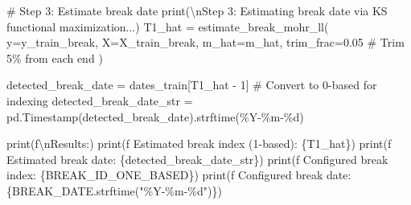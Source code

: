 \documentclass[
  letterpaper,
  DIV=11,
  numbers=noendperiod]{scrartcl}
\newenvironment{Shaded}{\begin{snugshade}}{\end{snugshade}}
\newcommand{\BuiltInTok}[1]{\textcolor[rgb]{0.00,0.23,0.31}{#1}}
\newcommand{\CharTok}[1]{\textcolor[rgb]{0.13,0.47,0.30}{#1}}
\newcommand{\CommentTok}[1]{\textcolor[rgb]{0.37,0.37,0.37}{#1}}
\newcommand{\DecValTok}[1]{\textcolor[rgb]{0.68,0.00,0.00}{#1}}
\newcommand{\FloatTok}[1]{\textcolor[rgb]{0.68,0.00,0.00}{#1}}
\newcommand{\NormalTok}[1]{\textcolor[rgb]{0.00,0.23,0.31}{#1}}
\newcommand{\OperatorTok}[1]{\textcolor[rgb]{0.37,0.37,0.37}{#1}}
\newcommand{\SpecialCharTok}[1]{\textcolor[rgb]{0.37,0.37,0.37}{#1}}
\newcommand{\SpecialStringTok}[1]{\textcolor[rgb]{0.13,0.47,0.30}{#1}}
\newcommand{\StringTok}[1]{\textcolor[rgb]{0.13,0.47,0.30}{#1}}
\begin{document}
\begin{Shaded}
\begin{Highlighting}[]
\CommentTok{\# Step 3: Estimate break date}
\BuiltInTok{print}\NormalTok{(}\StringTok{\textquotesingle{}}\CharTok{\textbackslash{}n}\StringTok{Step 3: Estimating break date via KS functional maximization...\textquotesingle{}}\NormalTok{)}
\NormalTok{T1\_hat }\OperatorTok{=}\NormalTok{ estimate\_break\_mohr\_ll(}
\NormalTok{    y}\OperatorTok{=}\NormalTok{y\_train\_break,}
\NormalTok{    X}\OperatorTok{=}\NormalTok{X\_train\_break,}
\NormalTok{    m\_hat}\OperatorTok{=}\NormalTok{m\_hat,}
\NormalTok{    trim\_frac}\OperatorTok{=}\FloatTok{0.05}  \CommentTok{\# Trim 5\% from each end}
\NormalTok{)}

\NormalTok{detected\_break\_date }\OperatorTok{=}\NormalTok{ dates\_train[T1\_hat }\OperatorTok{{-}} \DecValTok{1}\NormalTok{]  }\CommentTok{\# Convert to 0{-}based for indexing}
\NormalTok{detected\_break\_date\_str }\OperatorTok{=}\NormalTok{ pd.Timestamp(detected\_break\_date).strftime(}\StringTok{\textquotesingle{}\%Y{-}\%m{-}}\SpecialCharTok{\%d}\StringTok{\textquotesingle{}}\NormalTok{)}

\BuiltInTok{print}\NormalTok{(}\SpecialStringTok{f\textquotesingle{}}\CharTok{\textbackslash{}n}\SpecialStringTok{Results:\textquotesingle{}}\NormalTok{)}
\BuiltInTok{print}\NormalTok{(}\SpecialStringTok{f\textquotesingle{}  Estimated break index (1{-}based): }\SpecialCharTok{\{}\NormalTok{T1\_hat}\SpecialCharTok{\}}\SpecialStringTok{\textquotesingle{}}\NormalTok{)}
\BuiltInTok{print}\NormalTok{(}\SpecialStringTok{f\textquotesingle{}  Estimated break date: }\SpecialCharTok{\{}\NormalTok{detected\_break\_date\_str}\SpecialCharTok{\}}\SpecialStringTok{\textquotesingle{}}\NormalTok{)}
\BuiltInTok{print}\NormalTok{(}\SpecialStringTok{f\textquotesingle{}  Configured break index: }\SpecialCharTok{\{}\NormalTok{BREAK\_ID\_ONE\_BASED}\SpecialCharTok{\}}\SpecialStringTok{\textquotesingle{}}\NormalTok{)}
\BuiltInTok{print}\NormalTok{(}\SpecialStringTok{f\textquotesingle{}  Configured break date: }\SpecialCharTok{\{}\NormalTok{BREAK\_DATE}\SpecialCharTok{.}\NormalTok{strftime(}\StringTok{"\%Y{-}\%m{-}}\SpecialCharTok{\%d}\StringTok{"}\NormalTok{)}\SpecialCharTok{\}}\SpecialStringTok{\textquotesingle{}}\NormalTok{)}
\end{Highlighting}
\end{Shaded}
\end{document}
